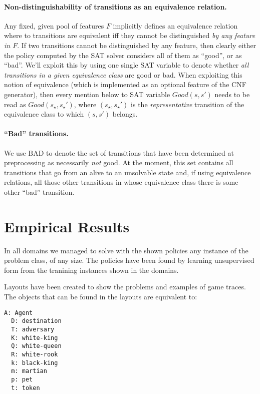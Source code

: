 \documentclass[a4paper]{article}
\newcommand{\badtx}{\ensuremath{\mathrm{BAD}}}
\begin{document}
\paragraph{Non-distinguishability of transitions as an equivalence relation.}
Any fixed, given pool of features $F$ implicitly defines an equivalence relation where to transitions are
equivalent iff they cannot be distinguished \emph{by any feature in $F$}.
If two transitions cannot be distinguished by any feature, then clearly either the policy computed by the SAT solver
considers all of them as ``good'', or as ``bad''.
We'll exploit this by using one single SAT variable to denote whether \emph{all transitions in a given equivalence
class} are good or bad. When exploiting this notion of equivalence (which is implemented as an optional feature of
the CNF generator), then every mention below to SAT variable $Good(s, s')$ needs to be read as $Good(s_{\star}, s_{\star}')$,
where $(s_{\star}, s_{\star}')$ is the \emph{representative} transition of the equivalence class to which $(s, s')$ belongs.

\paragraph{``Bad'' transitions.}
We use \badtx{} to denote the set of transitions that have been determined at preprocessing as necessarily
\emph{not} good.
At the moment, this set contains all transitions that go from an alive to an unsolvable state and, if using
equivalence relations, all those other transitions in whose equivalence class there is some other ``bad'' transition.


\newpage

\section{Empirical Results}

In all domains we managed to solve with the shown policies any instance of the problem class, of any size. The policies have been found by learning unsupervised form from the tranining instances shown in the domains.

Layouts have been created to show the problems and examples of game traces. The objects that can be found in the layouts are equivalent to:
\begin{Verbatim}[fontsize=\footnotesize]
  A: Agent
  D: destination
  T: adversary
  K: white-king
  Q: white-queen
  R: white-rook
  k: black-king
  m: martian
  p: pet
  t: token
\end{Verbatim}
\end{document}
